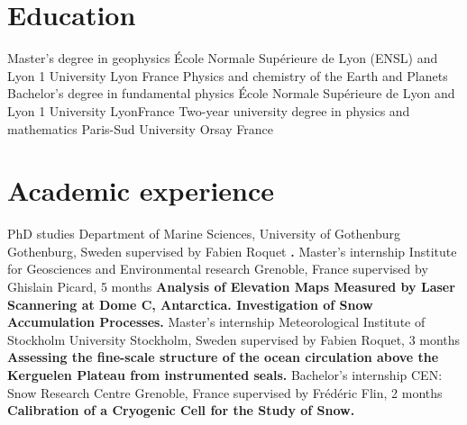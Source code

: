 \documentclass[11pt,a4paper,roman]{moderncv}
\begin{document}
\makecvtitle


\section{Education}
        {Master's degree in geophysics}
        {École Normale Supérieure de Lyon (ENSL) and Lyon 1 University}
        {Lyon}
        {France}
        {Physics and chemistry of the Earth and Planets}
        {Bachelor's degree in fundamental physics}
        {École Normale Supérieure de Lyon and Lyon 1 University}
        {Lyon}{France}{}
        {Two-year university degree in physics and mathematics}
        {Paris-Sud University}
        {Orsay}
        {France}
        {}


\section{Academic experience}
        {PhD studies}
        {Department of Marine Sciences, University of Gothenburg}
        {Gothenburg, Sweden}
        {supervised by Fabien Roquet}
        {\textbf{.}}
        {Master's internship}
        {Institute for Geosciences and Environmental research}
        {Grenoble, France}
        {supervised by Ghislain Picard, 5 months}
        {\textbf{Analysis of Elevation Maps Measured by Laser Scannering at
            Dome C, Antarctica. Investigation of Snow Accumulation Processes.}}
        {Master's internship}
        {Meteorological Institute of Stockholm University}
        {Stockholm, Sweden}
        {supervised by Fabien Roquet, 3 months}
        {\textbf{Assessing the fine-scale structure of the ocean
            circulation above the Kerguelen Plateau from instrumented seals.}}
        {Bachelor's internship}
        {CEN: Snow Research Centre}
        {Grenoble, France}
        {supervised by Frédéric Flin, 2 months}
        {\textbf{Calibration of a Cryogenic Cell for the Study of Snow.}}

        
\end{document}
